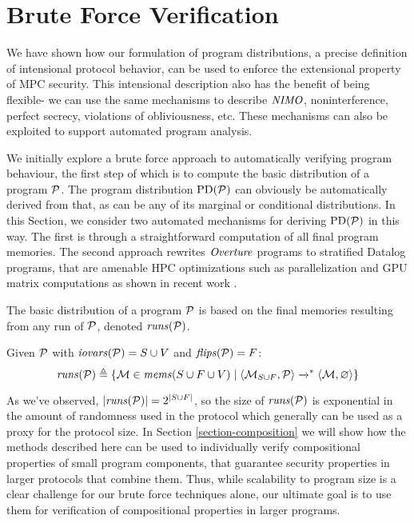 \section{Brute Force Verification}
\label{section-bruteforce}

We have shown how our formulation of program distributions, a precise
definition of intensional protocol behavior, can be used to enforce
the extensional property of MPC security. This intensional description
also has the benefit of being flexible- we can use the same mechanisms
to describe $\mathit{NIMO}$, noninterference, perfect secrecy, violations of
obliviousness, etc. These mechanisms can also be exploited to support
automated program analysis.

We initially explore a brute force approach to automatically verifying
program behaviour, the first step of which is to compute the basic
distribution of a program $\mathcal{P}$. The program distribution
$\mathrm{PD}(\mathcal{P})$ can obviously be automatically derived from that, as
can be any of its marginal or conditional distributions. In this
Section, we consider two automated mechanisms for deriving
$\mathrm{PD}(\mathcal{P})$ in this way. The first is through a straightforward
computation of all final program memories.  The second approach
rewrites $\mathit{Overture}$ programs to stratified Datalog programs, that are
amenable HPC optimizations such as parallelization and GPU matrix
computations as shown in recent work
\cite{sakama2017linear,aspis2018linear,nguyen2022enhancing,nguyen2021efficient}.

The basic distribution of a program $\mathcal{P}$ is based on the
final memories resulting from any run of $\mathcal{P}$, denoted
$\mathit{runs}(\mathcal{P})$.
\begin{definition}
  Given $\mathcal{P}$ with $\mathit{iovars}(\mathcal{P}) = S \cup V$ and $\mathit{flips}(\mathcal{P}) = F$:
  $$
  \mathit{runs}(\mathcal{P}) \triangleq \{ \mathcal{M} \in \mathit{mems}(S\cup F \cup V) \mid \langle \mathcal{M}_{S \cup F},\mathcal{P} \rangle \xrightarrow{}^{*} \langle \mathcal{M},\varnothing \rangle \}
  $$
\end{definition}
As we've observed, $|\mathit{runs}(\mathcal{P})| = 2^{|S \cup F|}$, so the size of
$\mathit{runs}(\mathcal{P})$ is exponential in the amount of randomness used in the
protocol which generally can be used as a proxy for the protocol
size. In Section \ref{section-composition} we will show how the
methods described here can be used to individually verify
compositional properties of small program components, that guarantee
security properties in larger protocols that combine them. Thus, while
scalability to program size is a clear challenge for our brute force
techniques alone, our ultimate goal is to use them for verification of
compositional properties in larger programs.

